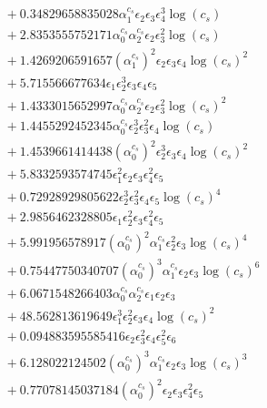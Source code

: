 \documentclass[10pt]{article}
\begin{document}
\begin{align*}
&{}  + 0.34829658835028 \alpha_{1}^{c_s} \epsilon_{2} \epsilon_{3} \epsilon_{4}^{3} \log{\left(c_{s} \right)} \\
&{}  + 2.8353555752171 \alpha_{0}^{c_s} \alpha_{2}^{c_s} \epsilon_{2} \epsilon_{3}^{2} \log{\left(c_{s} \right)} \\
&{}  + 1.4269206591657 \left(\alpha_{1}^{c_s}\right)^{2} \epsilon_{2} \epsilon_{3} \epsilon_{4} \log{\left(c_{s} \right)}^{2} \\
&{}  + 5.715566677634 \epsilon_{1} \epsilon_{2}^{3} \epsilon_{3} \epsilon_{4} \epsilon_{5} \\
&{}  + 1.4333015652997 \alpha_{0}^{c_s} \alpha_{2}^{c_s} \epsilon_{2} \epsilon_{3}^{2} \log{\left(c_{s} \right)}^{2} \\
&{}  + 1.4455292452345 \alpha_{0}^{c_s} \epsilon_{2}^{3} \epsilon_{3}^{2} \epsilon_{4} \log{\left(c_{s} \right)} \\
&{}  + 1.4539661414438 \left(\alpha_{0}^{c_s}\right)^{2} \epsilon_{2}^{3} \epsilon_{3} \epsilon_{4} \log{\left(c_{s} \right)}^{2} \\
&{}  + 5.8332593574745 \epsilon_{1}^{2} \epsilon_{2} \epsilon_{3} \epsilon_{4}^{2} \epsilon_{5} \\
&{}  + 0.72928929805622 \epsilon_{2}^{3} \epsilon_{3}^{2} \epsilon_{4} \epsilon_{5} \log{\left(c_{s} \right)}^{4} \\
&{}  + 2.9856462328805 \epsilon_{1} \epsilon_{2}^{2} \epsilon_{3} \epsilon_{4}^{2} \epsilon_{5} \\
&{}  + 5.991956578917 \left(\alpha_{0}^{c_s}\right)^{2} \alpha_{1}^{c_s} \epsilon_{2}^{2} \epsilon_{3} \log{\left(c_{s} \right)}^{4} \\
&{}  + 0.75447750340707 \left(\alpha_{0}^{c_s}\right)^{3} \alpha_{1}^{c_s} \epsilon_{2} \epsilon_{3} \log{\left(c_{s} \right)}^{6} \\
&{}  + 6.0671548266403 \alpha_{0}^{c_s} \alpha_{2}^{c_s} \epsilon_{1} \epsilon_{2} \epsilon_{3} \\
&{}  + 48.562813619649 \epsilon_{1}^{3} \epsilon_{2}^{2} \epsilon_{3} \epsilon_{4} \log{\left(c_{s} \right)}^{2} \\
&{}  + 0.094883595585416 \epsilon_{2} \epsilon_{3}^{2} \epsilon_{4} \epsilon_{5}^{2} \epsilon_{6} \\
&{}  + 6.128022124502 \left(\alpha_{0}^{c_s}\right)^{3} \alpha_{1}^{c_s} \epsilon_{2} \epsilon_{3} \log{\left(c_{s} \right)}^{3} \\
&{}  + 0.77078145037184 \left(\alpha_{0}^{c_s}\right)^{2} \epsilon_{2} \epsilon_{3} \epsilon_{4}^{2} \epsilon_{5} \\

\end{align*}
\end{document}
